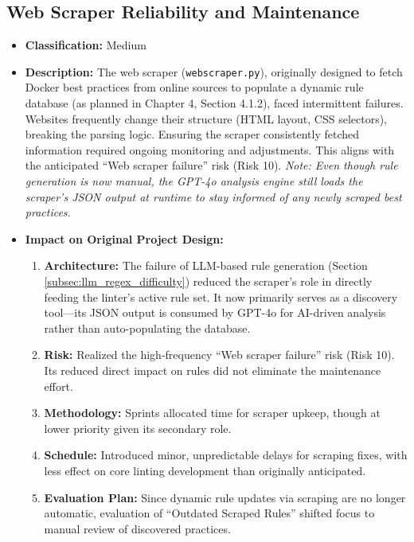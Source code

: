\subsection{Web Scraper Reliability and Maintenance}
\label{subsec:scraper_difficulty}
\begin{itemize}
    \item \textbf{Classification:} Medium
    \item \textbf{Description:} The web scraper (\texttt{webscraper.py}), originally designed to fetch Docker best practices from online sources to populate a dynamic rule database (as planned in Chapter 4, Section 4.1.2), faced intermittent failures. Websites frequently change their structure (HTML layout, CSS selectors), breaking the parsing logic. Ensuring the scraper consistently fetched information required ongoing monitoring and adjustments. This aligns with the anticipated “Web scraper failure” risk (Risk 10).  
    \newline\textit{Note: Even though rule generation is now manual, the GPT-4o analysis engine still loads the scraper’s JSON output at runtime to stay informed of any newly scraped best practices.}

    \item \textbf{Impact on Original Project Design:}
        \begin{enumerate}
            \item \textbf{Architecture:} The failure of LLM-based rule generation (Section \ref{subsec:llm_regex_difficulty}) reduced the scraper’s role in directly feeding the linter’s active rule set. It now primarily serves as a discovery tool—its JSON output is consumed by GPT-4o for AI-driven analysis rather than auto-populating the database.
            \item \textbf{Risk:} Realized the high‐frequency “Web scraper failure” risk (Risk 10). Its reduced direct impact on rules did not eliminate the maintenance effort.
            \item \textbf{Methodology:} Sprints allocated time for scraper upkeep, though at lower priority given its secondary role.
            \item \textbf{Schedule:} Introduced minor, unpredictable delays for scraping fixes, with less effect on core linting development than originally anticipated.
            \item \textbf{Evaluation Plan:} Since dynamic rule updates via scraping are no longer automatic, evaluation of “Outdated Scraped Rules” shifted focus to manual review of discovered practices.
        \end{enumerate}


\end{itemize}

